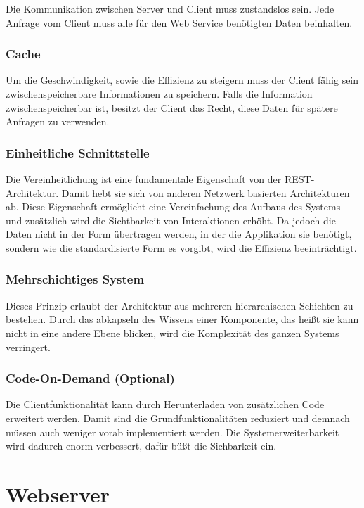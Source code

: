 Die Kommunikation zwischen Server und Client muss zustandslos sein. Jede Anfrage vom Client muss alle für den Web Service benötigten Daten beinhalten. 

\subsubsection{Cache}

Um die Geschwindigkeit, sowie die Effizienz zu steigern muss der Client fähig sein zwischenspeicherbare Informationen zu speichern. Falls die Information zwischenspeicherbar ist, besitzt der Client das Recht, diese Daten für spätere Anfragen zu verwenden.

\subsubsection{Einheitliche Schnittstelle}

Die Vereinheitlichung ist eine fundamentale Eigenschaft von der REST-Architektur. Damit hebt sie sich von anderen Netzwerk basierten Architekturen ab. Diese Eigenschaft ermöglicht eine Vereinfachung des Aufbaus des Systems und zusätzlich wird die Sichtbarkeit von Interaktionen erhöht. Da jedoch die Daten nicht in der Form übertragen werden, in der die Applikation sie benötigt, sondern wie die standardisierte Form es vorgibt, wird die Effizienz beeinträchtigt.  

\subsubsection{Mehrschichtiges System}

Dieses Prinzip erlaubt der Architektur aus mehreren hierarchischen Schichten zu bestehen. Durch das abkapseln des Wissens einer Komponente, das heißt sie kann nicht in eine andere Ebene blicken, wird die Komplexität des ganzen Systems verringert.

\subsubsection{Code-On-Demand (Optional)}

Die Clientfunktionalität kann durch Herunterladen von zusätzlichen Code erweitert werden. Damit sind die Grundfunktionalitäten reduziert und demnach müssen auch weniger vorab implementiert werden. Die Systemerweiterbarkeit wird dadurch enorm verbessert, dafür büßt die Sichbarkeit ein.

\section{Webserver}


